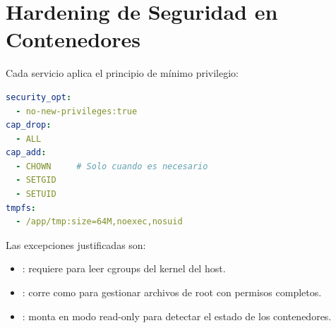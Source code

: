 \section{Hardening de Seguridad en Contenedores}

Cada servicio aplica el principio de mínimo privilegio:

\begin{lstlisting}[language=yaml,caption=Configuración de seguridad base (docker-compose.yml)]
security_opt:
  - no-new-privileges:true
cap_drop:
  - ALL
cap_add:
  - CHOWN     # Solo cuando es necesario
  - SETGID
  - SETUID
tmpfs:
  - /app/tmp:size=64M,noexec,nosuid
\end{lstlisting}

Las excepciones justificadas son:
\begin{itemize}
  \item {}: requiere  para leer
    cgroups del kernel del host.
  \item {}: corre como  para
    gestionar archivos de root con permisos completos.
  \item {}: monta  en modo read-only
    para detectar el estado de los contenedores.
\end{itemize}
